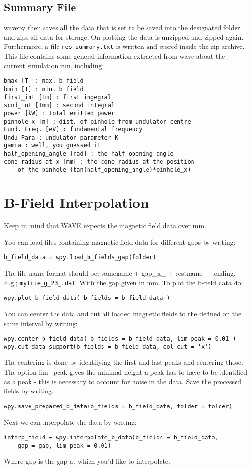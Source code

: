 \documentclass[
12pt,%
a4paper,  %
twoside        %
]{report}
\begin{document}
\subsection{Summary File}

wavepy then saves all the data that is set to be saved into the designated folder and zips all data for storage. On plotting the data is unzipped and zipped again. Furthermore, a file \verb+res_summary.txt+ is written and stored inside the zip archive. This file contains some general information extracted from wave about the current simulation run, including:
\begin{verbatim}
bmax [T] : max. b field
bmin [T] : min. b field
first_int [Tm] : first ingegral
scnd_int [Tmm] : second integral
power [kW] : total emitted power
pinhole_x [m] : dist. of pinhole from undulator centre
Fund. Freq. [eV] : fundamental frequency
Undu_Para : undulator parameter K
gamma : well, you guessed it
half_opening_angle [rad] : the half-opening angle
cone_radius_at_x [mm] : the cone-radius at the position
	of the pinhole (tan(half_opening_angle)*pinhole_x)
\end{verbatim}

\section{B-Field Interpolation}

Keep in mind that WAVE expects the magnetic field data over mm.

You can load files containing magnetic field data for different gaps by writing:
\begin{verbatim}
b_field_data = wpy.load_b_fields_gap(folder)
\end{verbatim}

The file name format should be: somename + gap\_x\_ + restname + .ending. E.g.; \verb+myfile_g_23_.dat+. With the gap given in mm. 
To plot the b-field data do:
\begin{verbatim}
wpy.plot_b_field_data( b_fields = b_field_data )
\end{verbatim}
You can center the data and cut all loaded magnetic fields to the defined on the same interval by writing:
\begin{verbatim}
wpy.center_b_field_data( b_fields = b_field_data, lim_peak = 0.01 )
wpy.cut_data_support(b_fields = b_field_data, col_cut = 'x')
\end{verbatim}
The centering is done by identifying the first and last peaks and centering those. The option lim\_peak gives the minimal height a peak has to have to be identified as a peak - this is necessary to account for noise in the data.
Save the processed fields by writing:
\begin{verbatim}
wpy.save_prepared_b_data(b_fields = b_field_data, folder = folder)
\end{verbatim}
Next we can interpolate the data by writing:
\begin{verbatim}
interp_field = wpy.interpolate_b_data(b_fields = b_field_data, 
	gap = gap, lim_peak = 0.01)
\end{verbatim}
Where gap is the gap at which you'd like to interpolate.
\end{document}
